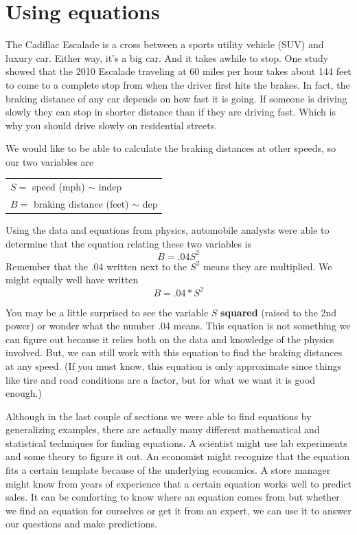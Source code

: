 \section{Using equations} 

The Cadillac Escalade is a cross between a sports utility vehicle (SUV) and luxury car.  Either way, it's a big car.  And it takes awhile to stop.  One study showed that the 2010 Escalade traveling at 60 miles per hour takes about 144 feet to come to a complete stop from when the driver first hits the brakes.   In fact, the braking distance of any car depends on how fast it is going.  If someone is driving slowly they can stop in shorter distance than if they are driving fast.  Which is why you should drive slowly on residential streets.  

We would like to be able to calculate the braking distances at other speeds, so our two variables are
\begin{center}
\begin{tabular} {l} 
$S=$ speed (mph) $\sim$ indep \\
$B= $ braking distance (feet) $\sim$ dep \\ 
\end{tabular}
\end{center}
Using the data and equations from physics, automobile analysts were able to determine that the equation relating these two variables is $$B=.04S^2$$  Remember that the .04 written next to the $S^2$ means they are multiplied.  We might equally well have written $$B = .04 \ast S^2$$ 

You may be a little surprised to see the variable $S$ \textbf{squared} (raised to the 2nd power) or wonder what the number .04 means.  This equation is not something we can figure out because it relies both on the data and knowledge of the physics involved.  But, we can still work with this equation to find the braking distances at any speed.   (If you must know, this equation is only approximate since things like tire and road conditions are a factor, but for what we want it is good enough.)

Although in the last couple of sections we were able to find equations by generalizing examples, there are actually many different mathematical and statistical techniques for finding equations. A scientist might use lab experiments and some theory to figure it out.  An economist might recognize that the equation fits a certain template because of the underlying economics.  A store manager might know from years of experience that a certain equation works well to predict sales.  It can be comforting to know where an equation comes from but whether we find an equation for ourselves or get it from an expert, we can use it to answer our questions and make predictions. 

